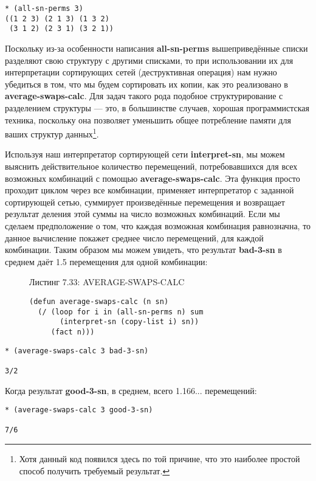 \begin{verbatim}
* (all-sn-perms 3)
((1 2 3) (2 1 3) (1 3 2)
 (3 1 2) (2 3 1) (3 2 1))
\end{verbatim}

Поскольку из-за особенности написания \textbf{all-sn-perms} вышеприведённые списки разделяют свою структуру с другими списками, то при использовании их для интерпретации сортирующих сетей (деструктивная операция) нам нужно убедиться в том, что мы будем сортировать их копии, как это реализовано в \textbf{average-swaps-calc}. Для задач такого рода подобное структурирование с разделением структуры --- это, в большинстве случаев, хорошая программистская техника, поскольку она позволяет уменьшить общее потребление памяти для ваших структур данных\footnote{Хотя данный код появился здесь по той причине, что это наиболее простой способ получить требуемый результат.}.

Используя наш интерпретатор сортирующей сети \textbf{interpret-sn}, мы можем выяснить действительное количество перемещений, потребовавшихся для всех возможных комбинаций с помощью \textbf{average-swaps-calc}. Эта функция просто проходит циклом через все комбинации, применяет интерпретатор с заданной сортирующей сетью, суммирует произведённые перемещения и возвращает результат деления этой суммы на число возможных комбинаций. Если мы сделаем предположение о том, что каждая возможная комбинация равнозначна, то данное вычисление покажет среднее число перемещений, для каждой комбинации. Таким образом мы можем увидеть, что результат \textbf{bad-3-sn} в среднем даёт 1.5 перемещения для одной комбинации:

\begin{figure}Листинг 7.33: AVERAGE-SWAPS-CALC\label{listing_7.33}
\listbegin
\begin{verbatim}
(defun average-swaps-calc (n sn)
  (/ (loop for i in (all-sn-perms n) sum
       (interpret-sn (copy-list i) sn))
     (fact n)))
\end{verbatim}
\listend
\end{figure}

\begin{verbatim}
* (average-swaps-calc 3 bad-3-sn)

3/2
\end{verbatim}

Когда результат \textbf{good-3-sn}, в среднем, всего 1.166... перемещений:

\begin{verbatim}
* (average-swaps-calc 3 good-3-sn)

7/6
\end{verbatim}

